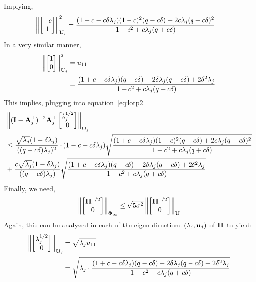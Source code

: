 Implying,
\begin{align*}
\left\lVert\begin{bmatrix}-c\\1\end{bmatrix}\right\rVert^2_{\mathbf{U}_j}&=\frac{(1+c-c\delta\lambda_j)(1-c)^2(q -c\delta)+2c\lambda_j(q -c\delta)^2}{1-c^2+c\lambda_j(q +c\delta)}
\end{align*}
In a very similar manner,
\begin{align*}
\left\lVert\begin{bmatrix}1\\0\end{bmatrix}\right\rVert^2_{\mathbf{U}_j}&=u_{11}\\
&=\frac{(1+c-c\delta\lambda_j)(q -c\delta)-2\delta\lambda_j(q -c\delta)+2\delta^2\lambda_j}{1-c^2+c\lambda_j(q +c\delta)}
\end{align*}
This implies, plugging into equation~\ref{eq:lotp2}
\begin{align}
\label{eq:lotp3}
&\left\lVert(\mathbf{I}-\mathbf{A}_j^{\top})^{-2}\mathbf{A}_j^{\top}\begin{bmatrix}\lambda_j^{1/2}\\0\end{bmatrix}\right\rVert_{\mathbf{U}_j}\nonumber\\&\leq\frac{\sqrt{\lambda_j}(1-\delta\lambda_j)}{((q -c\delta)\lambda_j)^2}\cdot(1-c+c\delta\lambda_j)\sqrt{\frac{(1+c-c\delta\lambda_j)(1-c)^2(q -c\delta)+2c\lambda_j(q -c\delta)^2}{1-c^2+c\lambda_j(q +c\delta)}}\nonumber\\&+\frac{c\sqrt{\lambda_j}(1-\delta\lambda_j)}{((q -c\delta)\lambda_j)}\sqrt{\frac{(1+c-c\delta\lambda_j)(q -c\delta)-2\delta\lambda_j(q -c\delta)+2\delta^2\lambda_j}{1-c^2+c\lambda_j(q +c\delta)}}
\end{align}
Finally, we need, 
\begin{align*}
\left\lVert\begin{bmatrix}\mathbf{H}^{1/2}\\0\end{bmatrix}\right\rVert_{\boldsymbol{\Phi}_{\infty}}\leq\sqrt{5\sigma^2}\left\lVert\begin{bmatrix}\mathbf{H}^{1/2}\\0\end{bmatrix}\right\rVert_{\mathbf{U}}
\end{align*}
Again, this can be analyzed in each of the eigen directions $(\lambda_j,\mathbf{u}_j)$ of $\mathbf{H}$ to yield:
\begin{align}
\label{eq:lotp4}
\left\lVert\begin{bmatrix}\lambda_j^{1/2}\\0\end{bmatrix}\right\rVert_{\mathbf{U}_j}&=\sqrt{\lambda_ju_{11}}\nonumber\\
&=\sqrt{\lambda_j\cdot\frac{(1+c-c\delta\lambda_j)(q -c\delta)-2\delta\lambda_j(q -c\delta)+2\delta^2\lambda_j}{1-c^2+c\lambda_j(q +c\delta)}}
\end{align}
